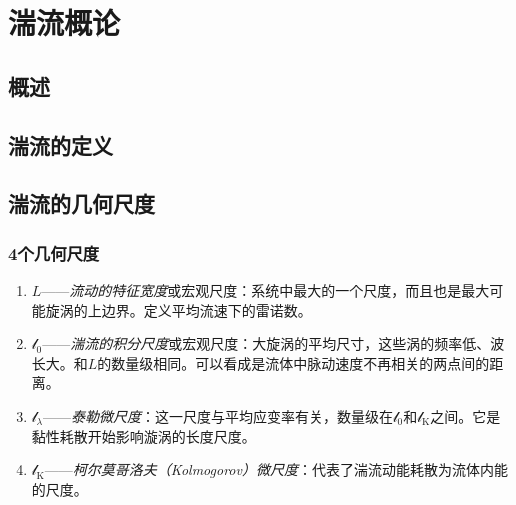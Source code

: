 \section{湍流概论}
\subsection{概述}
\subsection{湍流的定义}
\subsection{湍流的几何尺度}
\subsubsection{4个几何尺度}
\begin{enumerate}
    \item \(L\)——\textit{流动的特征宽度}或宏观尺度：系统中最大的一个尺度，而且也是最大可能旋涡的上边界。定义平均流速下的雷诺数。
    \item \(\mathcal{l}_0\)——\textit{湍流的积分尺度}或宏观尺度：大旋涡的平均尺寸，这些涡的频率低、波长大。和\(L\)的数量级相同。可以看成是流体中脉动速度不再相关的两点间的距离。
    \item \(\mathcal{l}_\lambda\)——\textit{泰勒微尺度}：这一尺度与平均应变率有关，数量级在\(\mathcal{l}_0\)和\(\mathcal{l}_\mathrm{K}\)之间。它是黏性耗散开始影响漩涡的长度尺度。
    \item \(\mathcal{l}_\mathrm{K}\)——\textit{柯尔莫哥洛夫（Kolmogorov）微尺度}：代表了湍流动能耗散为流体内能的尺度。
\end{enumerate}